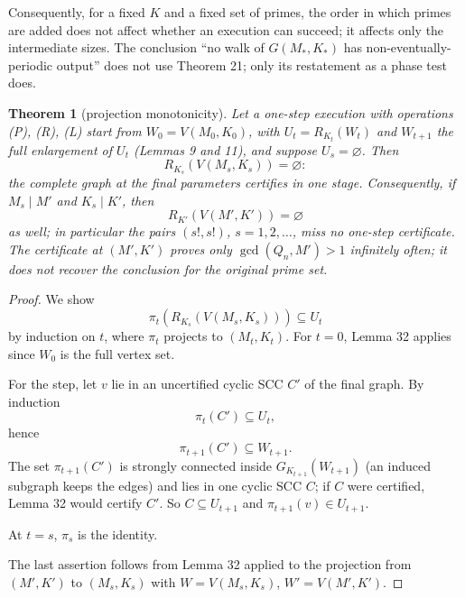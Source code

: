 \documentclass[11pt,reqno]{amsart}
\newtheorem{theorem}{Theorem}
\theoremstyle{definition}
\theoremstyle{remark}
\begin{document}
Consequently, for a fixed \(K\) and a fixed set of primes, the order in
which primes are added does not affect whether an execution can succeed;
it affects only the intermediate sizes. The conclusion ``no walk of
\(G(M_*,K_*)\) has non-eventually-periodic output'' does not use
Theorem 21; only its restatement as a phase test does.

\begin{samepage}
\begin{theorem}[projection monotonicity]\leavevmode\label{thm:34}
Let a one-step execution with
operations (P), (R), (L) start from \(W_0=V(M_0,K_0)\), with
\(U_t=R_{K_t}(W_t)\) and \(W_{t+1}\) the full enlargement of \(U_t\)
(Lemmas 9 and 11), and suppose \(U_s=\varnothing\). Then
\[
R_{K_s}(V(M_s,K_s))=\varnothing:
\]
the complete graph at the final
parameters certifies in one stage. Consequently, if \(M_s\mid M'\) and
\(K_s\mid K'\), then
\[
R_{K'}(V(M',K'))=\varnothing
\]
as well; in
particular the pairs \((s!,s!)\), \(s=1,2,\ldots\), miss no one-step
certificate. The certificate at \((M',K')\) proves only
\(\gcd(Q_n,M')>1\) infinitely often; it does not recover the conclusion
for the original prime set.
\label{thm-end:34}
\end{theorem}
\end{samepage}

\begin{proof}\leavevmode\label{proof:34}
We show
\[
\pi_t(R_{K_s}(V(M_s,K_s)))\subseteq U_t
\]
by
induction on \(t\), where \(\pi_t\) projects to \((M_t,K_t)\). For
\(t=0\), Lemma 32 applies since \(W_0\) is the full vertex set.

For the
step, let \(v\) lie in an uncertified cyclic SCC \(C'\) of the final
graph. By induction
\[
\pi_t(C')\subseteq U_t,
\]
hence
\[
\pi_{t+1}(C')\subseteq W_{t+1}.
\]
The set \(\pi_{t+1}(C')\) is
strongly connected inside \(G_{K_{t+1}}(W_{t+1})\) (an induced subgraph
keeps the edges) and lies in one cyclic SCC \(C\); if \(C\) were
certified, Lemma 32 would certify \(C'\). So \(C\subseteq U_{t+1}\) and
\(\pi_{t+1}(v)\in U_{t+1}\).

At \(t=s\), \(\pi_s\) is the identity.

The last assertion follows from
Lemma 32 applied to the projection from \((M',K')\) to \((M_s,K_s)\) with
\(W=V(M_s,K_s)\), \(W'=V(M',K')\). \qedhere
\end{proof}
\end{document}
